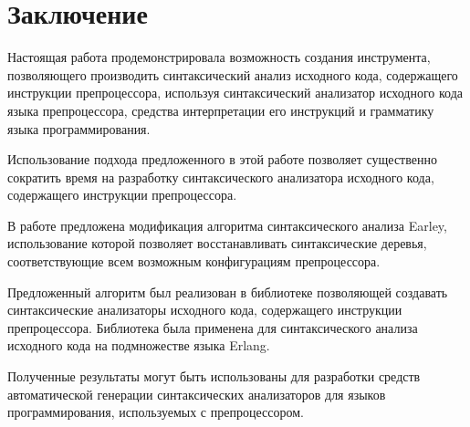 \clearpage

\section{Заключение}

Настоящая работа продемонстрировала возможность создания инструмента, позволяющего производить синтаксический анализ исходного кода, содержащего инструкции препроцессора, используя синтаксический анализатор исходного кода языка препроцессора, средства интерпретации его инструкций и грамматику языка программирования.

Использование подхода предложенного в этой работе позволяет существенно сократить время на разработку синтаксического анализатора исходного кода, содержащего инструкции препроцессора.

В работе предложена модификация алгоритма синтаксического анализа Earley, использование которой позволяет восстанавливать синтаксические деревья, соответствующие всем возможным конфигурациям препроцессора.

Предложенный алгоритм был реализован в библиотеке позволяющей создавать синтаксические анализаторы исходного кода, содержащего инструкции препроцессора. Библиотека была применена для синтаксического анализа исходного кода на подмножестве языка Erlang.

Полученные результаты могут быть использованы для разработки средств автоматической генерации синтаксических анализаторов для языков программирования, используемых с препроцессором.
